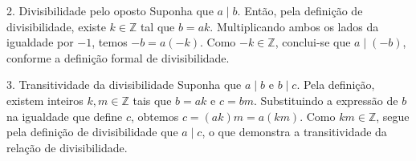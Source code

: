 \documentclass[12pt]{article}
\begin{document}
\begin{block}{2. Divisibilidade pelo oposto}
Suponha que $a \mid b$. Então, pela definição de divisibilidade, existe
$k \in \mathbb{Z}$ tal que $b = ak$. Multiplicando ambos os lados da igualdade
por $-1$, temos
$-b = a(-k).$
Como $-k \in \mathbb{Z}$, conclui-se que $a \mid (-b)$, conforme a definição
formal de divisibilidade.
\end{block}

\begin{block}{3. Transitividade da divisibilidade}
Suponha que $a \mid b$ e $b \mid c$. Pela definição, existem inteiros
$k,m \in \mathbb{Z}$ tais que $b = ak$ e $c = bm$. Substituindo a expressão
de $b$ na igualdade que define $c$, obtemos
$
c = (ak)m = a(km).
$
Como $km \in \mathbb{Z}$, segue pela definição de divisibilidade que
$a \mid c$, o que demonstra a transitividade da relação de divisibilidade.
\end{block}
\end{document}
